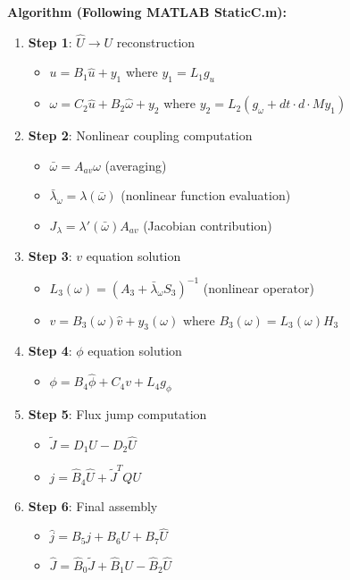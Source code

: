 \textbf{Algorithm (Following MATLAB StaticC.m):}
\begin{enumerate}
    \item \textbf{Step 1}: $\hat{U} \rightarrow U$ reconstruction
    \begin{itemize}
        \item $u = B_1 \hat{u} + y_1$ where $y_1 = L_1 g_u$
        \item $\omega = C_2 \hat{u} + B_2 \hat{\omega} + y_2$ where $y_2 = L_2(g_\omega + dt \cdot d \cdot M y_1)$
    \end{itemize}
    
    \item \textbf{Step 2}: Nonlinear coupling computation
    \begin{itemize}
        \item $\bar{\omega} = A_{av} \omega$ (averaging)
        \item $\bar{\lambda}_\omega = \lambda(\bar{\omega})$ (nonlinear function evaluation)
        \item $J_\lambda = \lambda'(\bar{\omega}) A_{av}$ (Jacobian contribution)
    \end{itemize}
    
    \item \textbf{Step 3}: $v$ equation solution
    \begin{itemize}
        \item $L_3(\omega) = (A_3 + \bar{\lambda}_\omega S_3)^{-1}$ (nonlinear operator)
        \item $v = B_3(\omega) \hat{v} + y_3(\omega)$ where $B_3(\omega) = L_3(\omega) H_3$
    \end{itemize}
    
    \item \textbf{Step 4}: $\phi$ equation solution
    \begin{itemize}
        \item $\phi = B_4 \hat{\phi} + C_4 v + L_4 g_\phi$
    \end{itemize}
    
    \item \textbf{Step 5}: Flux jump computation
    \begin{itemize}
        \item $\tilde{J} = D_1 U - D_2 \hat{U}$
        \item $j = \hat{B}_4 \hat{U} + \tilde{J}^T Q U$
    \end{itemize}
    
    \item \textbf{Step 6}: Final assembly
    \begin{itemize}
        \item $\hat{j} = B_5 j + B_6 U + B_7 \hat{U}$
        \item $\hat{J} = \hat{B}_0 \tilde{J} + \hat{B}_1 U - \hat{B}_2 \hat{U}$
    \end{itemize}
\end{enumerate}

